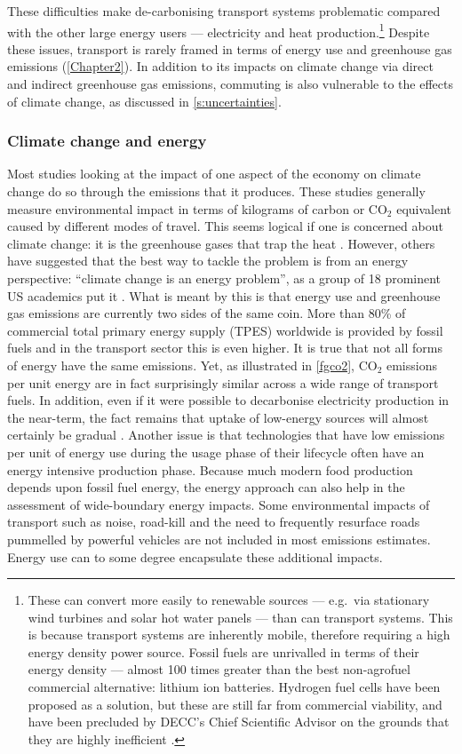 \documentclass[a4paper, 11pt, twoside]{Thesis}
\begin{document}
These difficulties make de-carbonising transport systems problematic
compared with the other large energy users --- electricity and heat
production.\footnote{These can convert more easily to renewable
sources --- e.g.~via stationary wind turbines
and solar hot water panels --- than can transport systems.
This is because transport systems are inherently mobile,
therefore requiring a high energy density power source.
Fossil fuels are unrivalled in terms of their energy density ---
almost 100 times greater than the best non-agrofuel commercial alternative:
lithium ion batteries. 
Hydrogen fuel cells have been proposed as a solution, but these are
still far from commercial viability, and have been 
precluded by DECC's Chief Scientific Advisor on the
grounds that they are highly inefficient \citep{MacKay2009}.}
Despite these issues, transport is rarely framed in terms of energy use and
greenhouse gas emissions (\cref{Chapter2}). In addition to
its impacts on climate change via direct and indirect greenhouse gas emissions,
commuting is also vulnerable to the effects of climate change,
as discussed in \cref{s:uncertainties}.

\subsubsection{Climate change and energy}
Most studies looking at the impact of one aspect of the economy on climate
change do so through the emissions that it produces.
These studies generally measure environmental impact in terms of kilograms of
carbon or  CO$_2$ equivalent caused by different modes of travel.
This seems logical if one is concerned about climate change:
it is the greenhouse gases that trap the heat \citep{Houghton1990}.
However, others have suggested
that the best way to tackle the problem is from an energy perspective:
``climate change is an energy problem'', as a group of 18 prominent US
academics put it \citep[p.~981]{Hoffert2002}. What is meant by this is that
energy use and greenhouse gas emissions are currently two sides of the same
coin. More than 80\% of commercial total primary energy supply (TPES)
worldwide is provided by fossil fuels \citep{Smil2008} and in the
transport sector this is even higher.
It is true that not all forms of energy have the same emissions. Yet,
as illustrated in \cref{fgco2}, CO$_2$ emissions per unit energy are
in fact surprisingly similar across a wide range of transport fuels.
In addition, even if it were possible to decarbonise electricity
production in the near-term, the fact remains that uptake of low-energy sources
will almost certainly be gradual \citep{smil2010energy}. Another issue is
that technologies that have low emissions per unit of energy use during the
usage phase of their lifecycle often have an energy intensive production
phase. Because much modern food production depends upon fossil fuel energy,
the energy approach can also help in the
assessment of wide-boundary energy impacts.
Some environmental impacts of transport such as noise, road-kill and
the need to frequently resurface roads pummelled by powerful vehicles are not
included in most emissions estimates. Energy use can to some degree
encapsulate these additional impacts.
\end{document}
